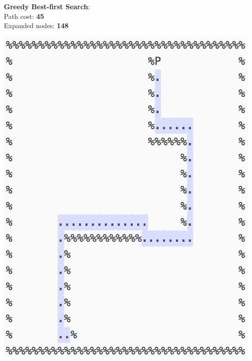 \documentclass[11pt]{article}
\begin{document}
\textbf{Greedy Best-first Search}:\\
Path cost: \textbf{45}\\
Expanded nodes: \textbf{148}
\begin{center}
\includegraphics[scale=1]{open-maze/gbfs.png}
\end{center}
\pagebreak
\end{document}
